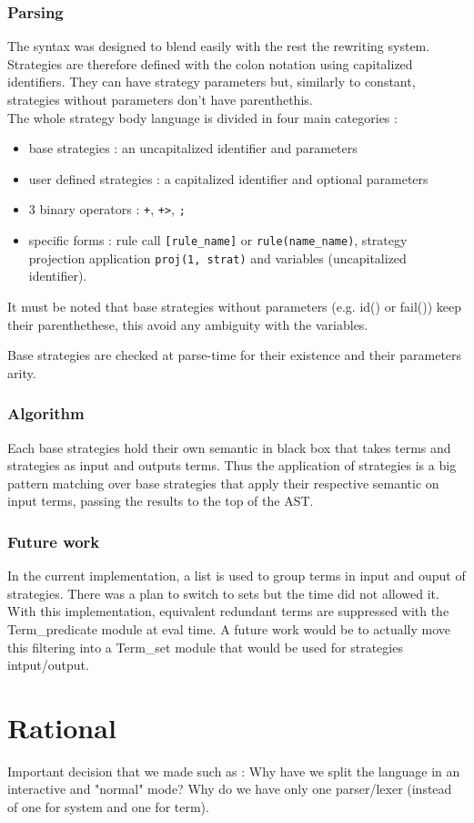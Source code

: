 \documentclass[12pt,a4paper]{article}
\begin{document}
\subsubsection*{Parsing}
The syntax was designed to blend easily with the rest the rewriting system. 
Strategies are therefore defined with the colon notation using capitalized 
identifiers. They can have strategy parameters but, similarly to constant, 
strategies without parameters don't have parenthethis. \\

The whole strategy body language is divided in four main categories :
\begin{itemize}
\item base strategies : an uncapitalized identifier and parameters
\item user defined strategies : a capitalized identifier and optional parameters
\item 3 binary operators : \verb|+|, \verb|+>|, \verb|;|
\item specific forms : rule call \verb|[rule_name]| or \verb|rule(name_name)|,
strategy projection application \verb|proj(1, strat)| and variables (uncapitalized 
identifier).
\end{itemize}

It must be noted that base strategies without parameters (e.g. id() or fail()) keep
their parenthethese, this avoid any ambiguity with the variables. 

Base strategies are checked at parse-time for their existence and their parameters
arity.

\subsubsection*{Algorithm}
Each base strategies hold their own semantic in black box that takes terms and 
strategies as input and outputs terms. Thus the application of strategies is 
a big pattern matching over base strategies that apply their respective semantic
on input terms, passing the results to the top of the AST.

\subsubsection*{Future work}
In the current implementation, a list is used to group terms in input and ouput of 
strategies. There was a plan to switch to sets but the time did not allowed it. 
With this implementation, equivalent redundant terms are suppressed with the 
Term\_predicate module at eval time. A future work would be to actually move
this filtering into a Term\_set module that would be used for strategies 
intput/output.

\section{Rational}
\label{rational}
Important decision that we made such as : Why have we split the language in an interactive and "normal" mode? Why do we have only one parser/lexer (instead of one for system and one for term).
\end{document}
